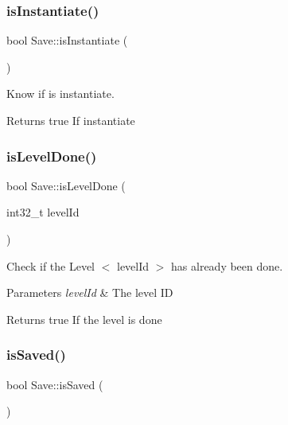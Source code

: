 \subsubsection{\texorpdfstring{is\+Instantiate()}{isInstantiate()}}
{\footnotesize\ttfamily bool Save\+::is\+Instantiate (\begin{DoxyParamCaption}{ }\end{DoxyParamCaption})\hspace{0.3cm}{\ttfamily [static]}}



Know if is instantiate. 

\begin{DoxyReturn}{Returns}
true If instantiate 
\end{DoxyReturn}
\mbox{\label{class_save_a75601bb68eba4ed487d5176acf6f51e9}} 
\subsubsection{\texorpdfstring{is\+Level\+Done()}{isLevelDone()}}
{\footnotesize\ttfamily bool Save\+::is\+Level\+Done (\begin{DoxyParamCaption}\item[{int32\+\_\+t}]{level\+Id }\end{DoxyParamCaption})\hspace{0.3cm}{\ttfamily [static]}}



Check if the Level $<$ level\+Id $>$ has already been done. 


\begin{DoxyParams}{Parameters}
{\em level\+Id} & The level ID \\
\hline
\end{DoxyParams}
\begin{DoxyReturn}{Returns}
true If the level is done 
\end{DoxyReturn}
\mbox{\label{class_save_a9efc33ad84705535d96b193d06426922}} 
\subsubsection{\texorpdfstring{is\+Saved()}{isSaved()}}
{\footnotesize\ttfamily bool Save\+::is\+Saved (\begin{DoxyParamCaption}{ }\end{DoxyParamCaption})\hspace{0.3cm}{\ttfamily [static]}}




